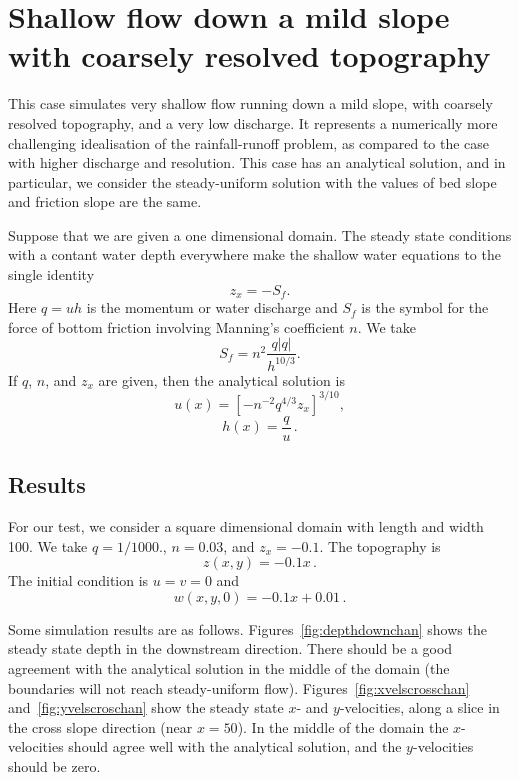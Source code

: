

\section{Shallow flow down a mild slope with coarsely resolved topography}
This case simulates very shallow flow running down a mild slope, with coarsely resolved topography, and a very low discharge. It represents a numerically more challenging idealisation of the rainfall-runoff problem, as compared to the case with higher discharge and resolution. This case has an analytical solution, and in particular, we consider the steady-uniform solution with the values of bed slope and friction slope are the same.   

Suppose that we are given a one dimensional domain. The steady state conditions with a contant water depth everywhere make the shallow water equations to the single identity
\begin{equation}
z_x = - S_f.
\end{equation}
Here $q=uh$ is the momentum or water discharge and $S_f$ is the symbol for the force of bottom friction involving Manning's coefficient $n$. We take 
\begin{equation}
S_f = n^2 \frac{q|q|}{h^{10/3}}.
\end{equation}
If $q$, $n$, and $z_x$ are given, then the analytical solution is
\begin{equation}
u(x)= \left[- n^{-2} q^{4/3} z_x\right]^{3/10},
\end{equation}
\begin{equation}
h(x)= \frac{q}{u}\,.
\end{equation}

\subsection{Results}
For our test, we consider a square dimensional domain with length and width 100. We take $q=1/1000.$, $n=0.03$, and $z_x=-0.1$.
The topography is
\begin{equation}
z(x, y)= -0.1 x\,.
\end{equation}
The initial condition is $u=v=0$ and
\begin{equation}
w(x,y,0)= -0.1 x + 0.01\,.
\end{equation}


Some simulation results are as follows.
Figures~\ref{fig:depthdownchan} shows the steady state depth in the downstream direction. There should be a good agreement with the analytical solution in the middle of the domain (the boundaries will not reach steady-uniform flow). 
Figures~\ref{fig:xvelscrosschan} and~\ref{fig:yvelscroschan} show the steady state $x$- and $y$-velocities, along a slice in the cross slope direction (near $x=50$). In the middle of the domain the $x$-velocities should agree well with the analytical solution, and the $y$-velocities should be zero. 

